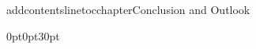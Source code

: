 \documentclass[12pt]{report}   %
\begin{document}























addcontentsline{toc}{chapter}{Conclusion and Outlook}



\titlespacing*{\chapter}
  {0pt}{0pt}{30pt}




\begin{singlespace}  %
	\setlength\bibitemsep{\baselineskip}  %
	\printbibliography[title={References}]
\end{singlespace}










\end{document}
